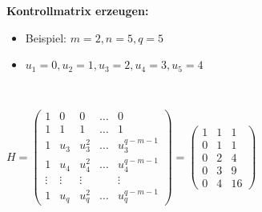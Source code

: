 \textbf{Kontrollmatrix erzeugen:}

\begin{itemize}
\item Beispiel: $m=2, n = 5, q = 5$
\item $u_1 = 0, u_2 = 1, u_3 = 2, u_4 = 3, u_5 = 4$
\end{itemize}\

$H = \begin{pmatrix}
1 & 0 & 0 & \dots & 0\\
1 & 1 & 1 & \dots & 1\\
1 & u_3 & u_3^2 & \dots & u_3^{q-m-1}\\
1 & u_4 & u_4^2 & \dots & u_4^{q-m-1}\\
\vdots & \vdots & \vdots & & \vdots\\
1 & u_q & u_q^2 & \dots & u_q^{q-m-1}
\end{pmatrix} = \begin{pmatrix}
1 & 1 & 1\\
0 & 1 & 1\\
0 & 2 & 4\\
0 & 3 & 9\\
0 & 4 & 16
\end{pmatrix}$
